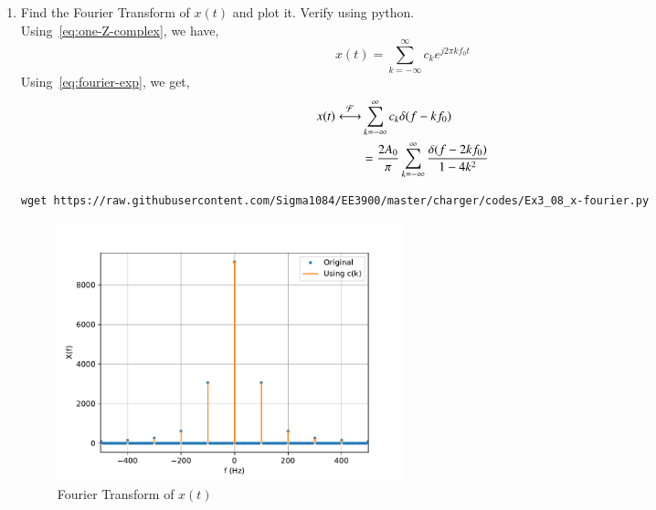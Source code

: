 \documentclass[journal,12pt,twocolumn]{IEEEtran}
\renewcommand\thesection{\arabic{section}}
\begin{document}
\begin{enumerate}[label=\thesection.\arabic*, ref=\thesection.\theenumi]
\item Find the Fourier Transform of $x(t)$ and plot it.
	Verify using python. \\
	\solution
	Using~\eqref{eq:one-Z-complex}, we have,
	\[ x(t) = \sum_{k = -\infty}^{\infty}c_k e^{j2\pi kf_0 t} \]
	Using~\eqref{eq:fourier-exp}, we get,
	\begin{align*}
		x(t) \overset{\mathcal{F}}{ \longleftrightarrow} & \sum_{k=-\infty}^\infty c_k \delta(f-kf_0) \\
		&= \frac{2A_0}{\pi} \sum_{k=-\infty}^\infty \frac{\delta(f-2kf_0)}{1-4k^2} \\
	\end{align*}
	\begin{lstlisting}
wget https://raw.githubusercontent.com/Sigma1084/EE3900/master/charger/codes/Ex3_08_x-fourier.py
	\end{lstlisting}
	\begin{figure}[h]
		\centering
		\includegraphics[width=0.5\textwidth]{figs/Ex3_08_verify_xt_fourier}
		\caption{Fourier Transform of $x(t)$}
		\label{fig:verify_xt_fourier}
	\end{figure}
	


\end{enumerate}
\end{document}
